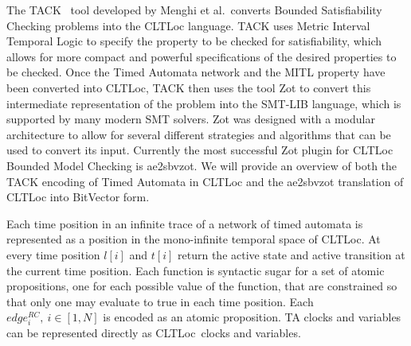 \documentclass[a4paper,11pt]{report}
\theoremstyle{definition}
\newcommand{\cltloc}{CLTLoc}
\newcommand{\aez}{ae2sbvzot}
\begin{document}
The TACK~\cite{tack20} tool developed by Menghi et al.\ converts Bounded
Satisfiability Checking problems into the CLTLoc language. TACK uses Metric
Interval Temporal Logic to specify the property to be checked for satisfiability,
which allows for more compact and powerful specifications of the desired
properties to be checked. Once the Timed Automata network and the MITL property
have been converted into CLTLoc, TACK then uses the tool Zot to convert this
intermediate representation of the problem into the SMT-LIB language, which is
supported by many modern SMT solvers. Zot was designed with a modular
architecture to allow for several different strategies and algorithms that can
be used to convert its input. Currently the most successful Zot plugin for
CLTLoc Bounded Model Checking is \aez. We will provide an overview of both
the TACK encoding of Timed Automata in CLTLoc and the ae2sbvzot translation of
CLTLoc into BitVector form.


Each time position in an infinite trace of a network of timed automata is
represented as a position in the mono-infinite temporal space of \cltloc. At
every time position $l[i]$ and $t[i]$ return the active state and active
transition at the current time position. Each function is syntactic sugar for a
set of atomic propositions, one for each possible value of the function, that
are constrained so that only one may evaluate to true in each time position.
Each $edge_{i}^{RC},\ i \in [1,N]$ is encoded as an atomic proposition. TA
clocks and variables can be represented directly as \cltloc\ clocks and
variables.
\end{document}
